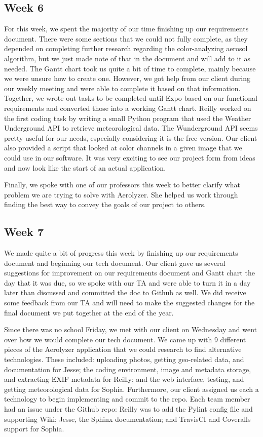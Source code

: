 \documentclass[onecolumn, draftclsnofoot,10pt, compsoc]{IEEEtran}
\begin{document}
\begin{flushleft}
\subsection{Week 6}

For this week, we spent the majority of our time finishing up our requirements document. There were some sections that we could not fully complete, as they depended on completing further research regarding the color-analyzing aerosol algorithm, but we just made note of that in the document and will add to it as needed.  The Gantt chart took us quite a bit of time to complete, mainly because we were unsure how to create one. However, we got help from our client during our weekly meeting and were able to complete it based on that information. Together, we wrote out tasks to be completed until Expo based on our functional requirements and converted those into a working Gantt chart. Reilly worked on the first coding task by writing a small Python program that used the Weather Underground API to retrieve meteorological data. The Wunderground API seems pretty useful for our needs, especially considering it is the free version. Our client also provided a script that looked at color channels in a given image that we could use in our software. It was very exciting to see our project form from ideas and now look like the start of an actual application.

\medskip

Finally, we spoke with one of our professors this week to better clarify what problem we are trying to solve with Aerolyzer. She helped us work through finding the best way to convey the goals of our project to others.

\subsection{Week 7}
We made quite a bit of progress this week by finishing up our requirements document and beginning our tech document. Our client gave us several suggestions for improvement on our requirements document and Gantt chart the day that it was due, so we spoke with our TA and were able to turn it in a day later than discussed and committed the doc to Github as well. We did receive some feedback from our TA and will need to make the suggested changes for the final document we put together at the end of the year. 

\medskip

Since there was no school Friday, we met with our client on Wednesday and went over how we would complete our tech document. We came up with 9 different pieces of the Aerolyzer application that we could research to find alternative technologies. These included: uploading photos, getting geo-related data, and documentation for Jesse; the coding environment, image and metadata storage, and extracting EXIF metadata for Reilly; and the web interface, testing, and getting meteorological data for Sophia. Furthermore, our client assigned us each a technology to begin implementing and commit to the repo. Each team member had an issue under the Github repo: Reilly was to add the Pylint config file and supporting Wiki; Jesse, the Sphinx documentation; and TravisCI and Coveralls support for Sophia.


\end{flushleft}
\end{document}
